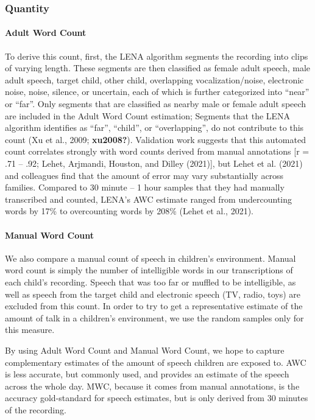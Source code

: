 \documentclass[
  man,floatsintext]{apa6}
\let\oldparagraph\paragraph
\renewcommand{\paragraph}[1]{\oldparagraph{#1}\mbox{}}
\begin{document}
\hypertarget{quantity}{%
\subsubsection{Quantity}\label{quantity}}

\hypertarget{adult-word-count}{%
\paragraph{Adult Word Count}\label{adult-word-count}}

To derive this count, first, the LENA algorithm segments the recording into clips of varying length. These segments are then classified as female adult speech, male adult speech, target child, other child, overlapping vocalization/noise, electronic noise, noise, silence, or uncertain, each of which is further categorized into ``near'' or ``far''. Only segments that are classified as nearby male or female adult speech are included in the Adult Word Count estimation; Segments that the LENA algorithm identifies as ``far'', ``child'', or ``overlapping'', do not contribute to this count (Xu et al., 2009; \textbf{xu2008?}). Validation work suggests that this automated count correlates strongly with word counts derived from manual annotations {[}r = .71 -- .92; Lehet, Arjmandi, Houston, and Dilley (2021){]}, but Lehet et al. (2021) and colleagues find that the amount of error may vary substantially across families. Compared to 30 minute -- 1 hour samples that they had manually transcribed and counted, LENA's AWC estimate ranged from undercounting words by 17\% to overcounting words by 208\% (Lehet et al., 2021).

\hypertarget{manual-word-count}{%
\paragraph{Manual Word Count}\label{manual-word-count}}

We also compare a manual count of speech in children's environment. Manual word count is simply the number of intelligible words in our transcriptions of each child's recording. Speech that was too far or muffled to be intelligible, as well as speech from the target child and electronic speech (TV, radio, toys) are excluded from this count. In order to try to get a representative estimate of the amount of talk in a children's environment, we use the random samples only for this measure.

By using Adult Word Count and Manual Word Count, we hope to capture complementary estimates of the amount of speech children are exposed to. AWC is less accurate, but commonly used, and provides an estimate of the speech across the whole day. MWC, because it comes from manual annotations, is the accuracy gold-standard for speech estimates, but is only derived from 30 minutes of the recording.
\end{document}
